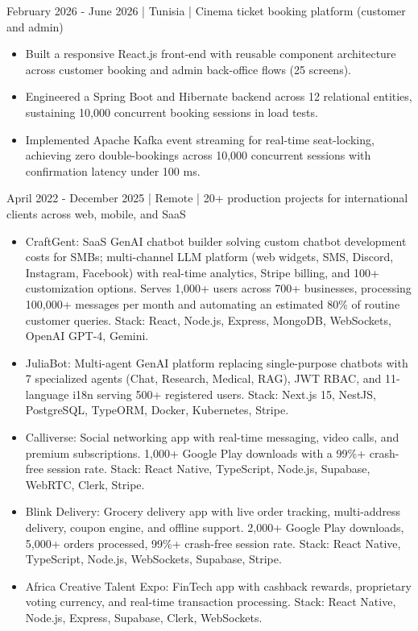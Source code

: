   {February 2026 - June 2026 | Tunisia | Cinema ticket booking platform (customer and admin)}
\begin{itemize}
  \item Built a responsive React.js front-end with reusable component architecture across customer booking and admin back-office flows (25 screens).
  \item Engineered a Spring Boot and Hibernate backend across 12 relational entities, sustaining 10,000 concurrent booking sessions in load tests.
  \item Implemented Apache Kafka event streaming for real-time seat-locking, achieving zero double-bookings across 10,000 concurrent sessions with confirmation latency under 100 ms.
\end{itemize}

  {April 2022 - December 2025 | Remote | 20+ production projects for international clients across web, mobile, and SaaS}
\begin{itemize}
  \item CraftGent: SaaS GenAI chatbot builder solving custom chatbot development costs for SMBs; multi-channel LLM platform (web widgets, SMS, Discord, Instagram, Facebook) with real-time analytics, Stripe billing, and 100+ customization options. Serves 1,000+ users across 700+ businesses, processing 100,000+ messages per month and automating an estimated 80\% of routine customer queries. Stack: React, Node.js, Express, MongoDB, WebSockets, OpenAI GPT-4, Gemini.
  \item JuliaBot: Multi-agent GenAI platform replacing single-purpose chatbots with 7 specialized agents (Chat, Research, Medical, RAG), JWT RBAC, and 11-language i18n serving 500+ registered users. Stack: Next.js 15, NestJS, PostgreSQL, TypeORM, Docker, Kubernetes, Stripe.
  \item Calliverse: Social networking app with real-time messaging, video calls, and premium subscriptions. 1,000+ Google Play downloads with a 99\%+ crash-free session rate. Stack: React Native, TypeScript, Node.js, Supabase, WebRTC, Clerk, Stripe.
  \item Blink Delivery: Grocery delivery app with live order tracking, multi-address delivery, coupon engine, and offline support. 2,000+ Google Play downloads, 5,000+ orders processed, 99\%+ crash-free session rate. Stack: React Native, TypeScript, Node.js, WebSockets, Supabase, Stripe.
  \item Africa Creative Talent Expo: FinTech app with cashback rewards, proprietary voting currency, and real-time transaction processing. Stack: React Native, Node.js, Express, Supabase, Clerk, WebSockets.
\end{itemize}

